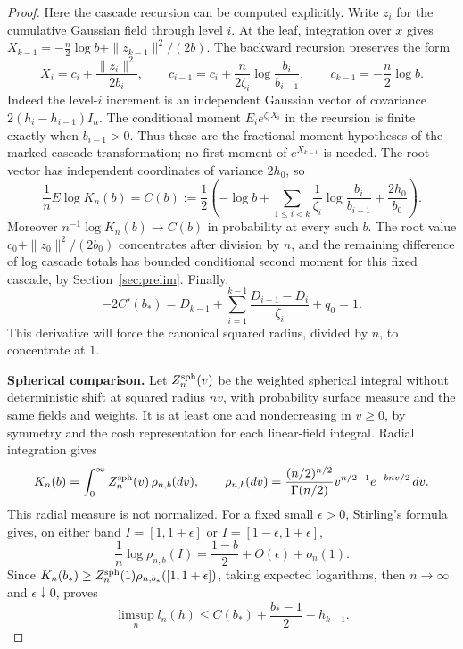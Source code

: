 \documentclass[11pt]{article}
\begin{document}
\begin{proof}
Here the cascade recursion can be computed explicitly. Write $z_i$ for the
cumulative Gaussian field through level $i$. At the leaf, integration over $x$ gives
$X_{k-1}=-\tfrac n2\log b+\|z_{k-1}\|^2/(2b)$.
The backward recursion preserves the form
\[
 X_i=c_i+\frac{\|z_i\|^2}{2b_i},\qquad
 c_{i-1}=c_i+\frac{n}{2\zeta_i}\log\frac{b_i}{b_{i-1}},
 \qquad c_{k-1}=-\frac n2\log b.
\]
Indeed the level-$i$ increment is an independent Gaussian vector of covariance
$2(h_i-h_{i-1})I_n$. The conditional moment $E_i e^{\zeta_iX_i}$ in the
recursion is finite exactly when $b_{i-1}>0$. Thus these are the
fractional-moment hypotheses of the
marked-cascade transformation; no first moment of $e^{X_{k-1}}$ is needed.
The root vector has independent coordinates of variance $2h_0$, so
\[
 \frac1n E\log K_n(b)=C(b):=
 \frac12\left(-\log b+
 \sum_{1\le i<k}\frac1{\zeta_i}\log\frac{b_i}{b_{i-1}}
 +\frac{2h_0}{b_0}\right).
\]
Moreover $n^{-1}\log K_n(b)\to C(b)$ in probability at every such $b$.
The root value $c_0+\|z_0\|^2/(2b_0)$ concentrates after division by $n$,
and the remaining difference of log cascade totals has bounded conditional
second moment for this fixed cascade, by Section~\ref{sec:prelim}.
Finally,
\[
 -2C'(b_*)=D_{k-1}+
 \sum_{i=1}^{k-1}\frac{D_{i-1}-D_i}{\zeta_i}+q_0=1.
\]
This derivative will force the canonical squared radius, divided by $n$,
to concentrate at $1$.

\textbf{Spherical comparison.}
Let $Z_n^{\rm sph}(v)$ be the weighted spherical integral without deterministic
shift at squared radius $nv$, with probability surface measure and the same
fields and weights. It is at least one and nondecreasing in $v\ge0$, by
symmetry and the cosh representation for each linear-field integral.
Radial integration gives
\[
 K_n(b)=\int_0^\infty Z_n^{\rm sph}(v)\,\rho_{n,b}(dv),\qquad
 \rho_{n,b}(dv)=
 \frac{(n/2)^{n/2}}{\Gamma(n/2)}v^{n/2-1}e^{-bnv/2}\,dv.
\]
This radial measure is not normalized. For a fixed small $\epsilon>0$,
Stirling's formula gives, on either band $I=[1,1+\epsilon]$ or
$I=[1-\epsilon,1+\epsilon]$,
\[
 \frac1n\log\rho_{n,b}(I)=\frac{1-b}{2}+O(\epsilon)+o_n(1).
\]
Since $K_n(b_*)\ge Z_n^{\rm sph}(1)\rho_{n,b_*}([1,1+\epsilon])$,
taking expected logarithms, then $n\to\infty$ and $\epsilon\downarrow0$,
proves
\[
 \limsup_n l_n(h)\le C(b_*)+\frac{b_*-1}{2}-h_{k-1}.
\]


\end{proof}
\end{document}
